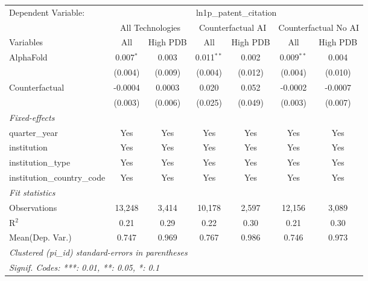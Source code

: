 \begingroup
\centering
\begin{tabular}{lcccccc}
   \tabularnewline \midrule \midrule
   Dependent Variable: & \multicolumn{6}{c}{ln1p\_patent\_citation}\\
 & \multicolumn{2}{c}{All Technologies} & \multicolumn{2}{c}{Counterfactual AI} & \multicolumn{2}{c}{Counterfactual No AI} \\
\cmidrule(lr){1-1}\cmidrule(lr){2-3} \cmidrule(lr){4-5} \cmidrule(lr){6-7}
Variables & \multicolumn{1}{c}{All} & \multicolumn{1}{c}{High PDB} & \multicolumn{1}{c}{All} & \multicolumn{1}{c}{High PDB} & \multicolumn{1}{c}{All} & \multicolumn{1}{c}{High PDB} \\
\cmidrule(lr){1-1}\cmidrule(lr){2-2} \cmidrule(lr){3-3} \cmidrule(lr){4-4} \cmidrule(lr){5-5} \cmidrule(lr){6-6} \cmidrule(lr){7-7}
   AlphaFold                    & 0.007$^{*}$ & 0.003   & 0.011$^{**}$ & 0.002   & 0.009$^{**}$ & 0.004\\   
                                & (0.004)     & (0.009) & (0.004)      & (0.012) & (0.004)      & (0.010)\\   
   Counterfactual               & -0.0004     & 0.0003  & 0.020        & 0.052   & -0.0002      & -0.0007\\   
                                & (0.003)     & (0.006) & (0.025)      & (0.049) & (0.003)      & (0.007)\\   
   \midrule
   \emph{Fixed-effects}\\
   quarter\_year                & Yes         & Yes     & Yes          & Yes     & Yes          & Yes\\  
   institution                  & Yes         & Yes     & Yes          & Yes     & Yes          & Yes\\  
   institution\_type            & Yes         & Yes     & Yes          & Yes     & Yes          & Yes\\  
   institution\_country\_code   & Yes         & Yes     & Yes          & Yes     & Yes          & Yes\\  
   \midrule
   \emph{Fit statistics}\\
   Observations                 & 13,248      & 3,414   & 10,178       & 2,597   & 12,156       & 3,089\\  
   R$^2$                        & 0.21        & 0.29    & 0.22         & 0.30    & 0.21         & 0.30\\  
Mean(Dep. Var.) & 0.747 & 0.969 & 0.767 & 0.986 & 0.746 & 0.973 \\
   \midrule \midrule
   \multicolumn{7}{l}{\emph{Clustered (pi\_id) standard-errors in parentheses}}\\
   \multicolumn{7}{l}{\emph{Signif. Codes: ***: 0.01, **: 0.05, *: 0.1}}\\
\end{tabular}
\par\endgroup
